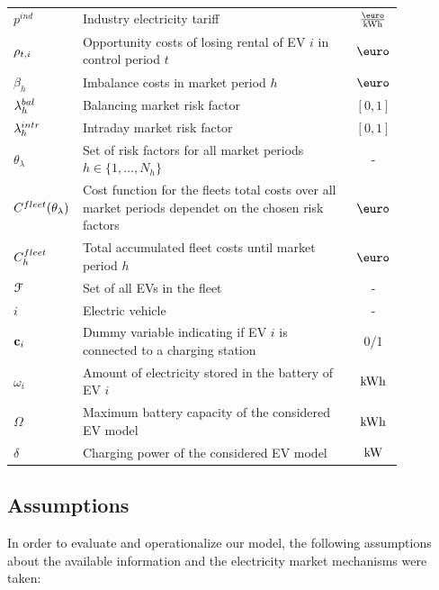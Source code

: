 \documentclass[a4paper, 12pt]{article}
\begin{document}
\begin{longtable}{p{0.11\linewidth}|p{0.75\linewidth}|c}
\(p^{ind}\) & Industry electricity tariff & \(\ekwh\)\\
\(\rho_{t,i}\) & Opportunity costs of losing rental of EV \(i\) in control period \(t\) & \(\eur\)\\
\(\beta_h\) & Imbalance costs in market period \(h\) & \(\eur\)\\
\hline
\(\lambda^{bal}_{h}\) & Balancing market risk factor & \([0,1]\)\\
\(\lambda^{intr}_{h}\) & Intraday market risk factor & \([0,1]\)\\
\(\theta_{\lambda}\) & Set of risk factors for all market periods \(h\!\in\!\{1,\hdots,N_h\}\) & -\\
\(C^{fleet}_{}(\theta_{\lambda})\) & Cost function for the fleets total costs over all market periods dependet on the chosen risk factors & \(\eur\)\\
\(C^{fleet}_{h}\) & Total accumulated fleet costs until market period \(h\) & \(\eur\)\\
\hline
\({\cal{F}}\) & Set of all EVs in the fleet & -\\
\(i\) & Electric vehicle & -\\
\({\bf{c}}_{i}\) & Dummy variable indicating if EV \(i\) is connected to a charging station & 0/1\\
\(\omega_{i}\) & Amount of electricity stored in the battery of EV \(i\) & \(\text{kWh}\)\\
\(\Omega\) & Maximum battery capacity of the considered EV model & \(\text{kWh}\)\\
\(\delta\) & Charging power of the considered EV model & \(\text{kW}\)\\
\hline
\end{longtable}

\subsection{Assumptions \label{sec-model-assumptions}}
\label{sec:orgeb88f79}

In order to evaluate and operationalize our model, the following assumptions
about the available information and the electricity market mechanisms were
taken:
\end{document}
